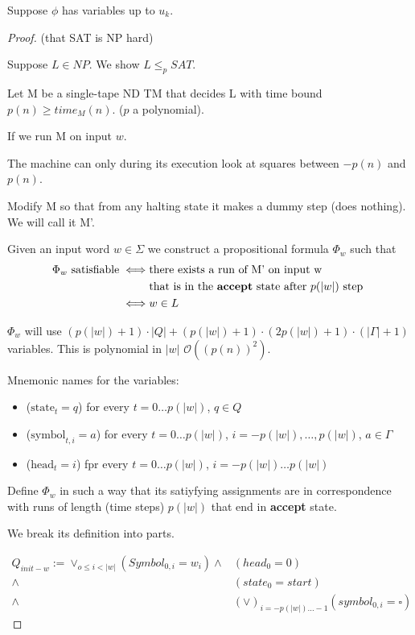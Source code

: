 \documentclass[a4paper,12pt]{article}
\theoremstyle{definition}
\theoremstyle{remark}
\begin{document}
Suppose $\phi$ has variables up to $u_k$.

\begin{proof}(that SAT is NP hard)

    Suppose $L \in NP$. We show $L \leq_p SAT$.

    Let M be a single-tape ND TM that decides L with time bound $p(n) \geq time_M(n)$. ($p$ a polynomial).

    If we run M on input $w$.

    The machine can only during its execution look at squares between $-p(n)$ and $p(n)$.

    Modify M so that from any halting state it makes a dummy step (does nothing). We will call it M'.

    Given an input word $w \in \Sigma$ we construct a propositional formula $\Phi_w$ such that
    \begin{align*}
        \Phi_w  \text{ satisfiable} \iff& \text{there exists a run of M' on input w} \\
                                       &\text{that is in the \textbf{accept} state after } p(|w|) \text{ step } \\
                                   \iff& w \in L
    \end{align*}

    $\Phi_w$ will use $(p(|w|) + 1) \cdot |Q| + (p(|w|) + 1) \cdot (2p(|w|) +1) \cdot (|\Gamma| + 1)$ variables. This
    is polynomial in $|w|$ $\mathscr{O}((p(n))^2)$.

    Mnemonic names for the variables:
    \begin{itemize}
        \item ($\text{state}_t = q$) for every $t = 0 \dots p(|w|)$, $q \in Q$
        \item ($\text{symbol}_{t, i} = a$) for every $t = 0 \dots p(|w|)$, $i = -p(|w|), \dots, p(|w|)$, $a \in \Gamma$
        \item ($\text{head}_t = i$) fpr every $t = 0 \dots p(|w|)$, $i = -p(|w|) \dots p(|w|)$ 
    \end{itemize}

    Define $\Phi_w$ in such a way that its satiyfying assignments are in correspondence with runs of length
    (time steps) $p(|w|)$ that end in \textbf{accept} state.

    We break its definition into parts.

    \begin{align*}
        Q_{init-w} := \vee_{o \leq i < |w|} (Symbol_{0, i} = w_i) \land& (head_0 = 0) \\
                                                                  \land& (state_0 = start) \\
                                                                  \land& (\vee)_{i = -p(|w|) \dots -1} (symbol_{0, i} = \square)
    \end{align*}
\end{proof}
\end{document}

